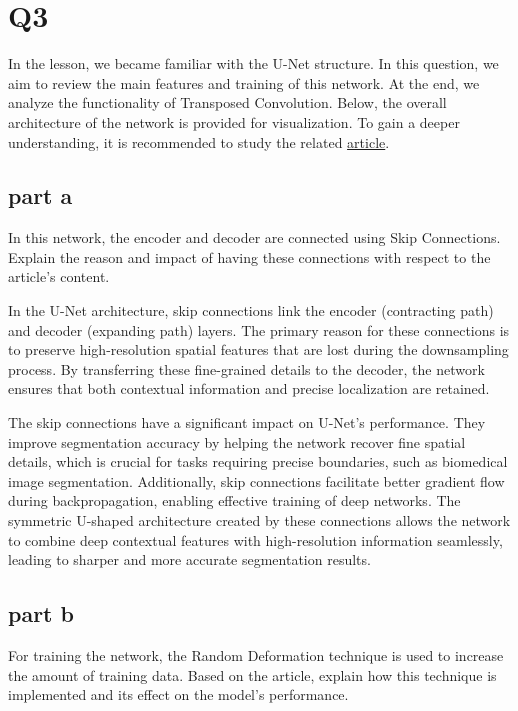 \section{Q3}

In the lesson, we became familiar with the U-Net structure. In this question, we aim to review the main features and training of this network. At the end, we analyze the functionality of Transposed Convolution. Below, the overall architecture of the network is provided for visualization. To gain a deeper understanding, it is recommended to study the related \href{https://arxiv.org/abs/1505.04597}{article}.
\subsection{part a}
In this network, the encoder and decoder are connected using Skip Connections. Explain the reason and impact of having these connections with respect to the article's content.
    
    \begin{qsolve}
      \begin{qsolve}[]
        In the U-Net architecture, skip connections link the encoder (contracting path) and decoder (expanding path) layers. The primary reason for these connections is to preserve high-resolution spatial features that are lost during the downsampling process. By transferring these fine-grained details to the decoder, the network ensures that both contextual information and precise localization are retained.

      The skip connections have a significant impact on U-Net's performance. They improve segmentation accuracy by helping the network recover fine spatial details, which is crucial for tasks requiring precise boundaries, such as biomedical image segmentation. Additionally, skip connections facilitate better gradient flow during backpropagation, enabling effective training of deep networks. The symmetric U-shaped architecture created by these connections allows the network to combine deep contextual features with high-resolution information seamlessly, leading to sharper and more accurate segmentation results.
      \end{qsolve}
    \end{qsolve}

\subsection{part b}
For training the network, the Random Deformation technique is used to increase the amount of training data. Based on the article, explain how this technique is implemented and its effect on the model's performance.
    
